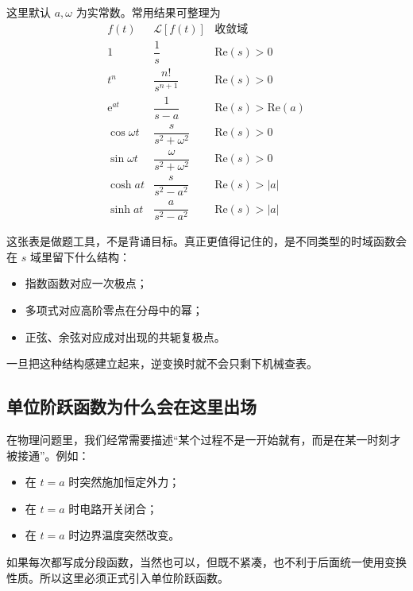 \begin{zhongyao}[常用拉普拉斯变换表]
这里默认 $a,\omega$ 为实常数。常用结果可整理为
\begingroup
\renewcommand{\arraystretch}{1.35}
\[
\begin{array}{c|c|c}
    f(t) & \mathcal{L}[f(t)] & \text{收敛域} \\
    \hline
    1 & \dfrac{1}{s} & \mathrm{Re}(s)>0 \\
    t^n & \dfrac{n!}{s^{n+1}} & \mathrm{Re}(s)>0 \\
    \mathrm{e}^{at} & \dfrac{1}{s-a} & \mathrm{Re}(s)>\mathrm{Re}(a) \\
    \cos\omega t & \dfrac{s}{s^2+\omega^2} & \mathrm{Re}(s)>0 \\
    \sin\omega t & \dfrac{\omega}{s^2+\omega^2} & \mathrm{Re}(s)>0 \\
    \cosh at & \dfrac{s}{s^2-a^2} & \mathrm{Re}(s)>|a| \\
    \sinh at & \dfrac{a}{s^2-a^2} & \mathrm{Re}(s)>|a|
\end{array}
\]
\endgroup
\end{zhongyao}

\begin{tishi}[变换表应该怎样使用]
这张表是做题工具，不是背诵目标。真正更值得记住的，是不同类型的时域函数会在 $s$ 域里留下什么结构：
\begin{itemize}
    \item 指数函数对应一次极点；
    \item 多项式对应高阶零点在分母中的幂；
    \item 正弦、余弦对应成对出现的共轭复极点。
\end{itemize}
一旦把这种结构感建立起来，逆变换时就不会只剩下机械查表。
\end{tishi}

\subsection{单位阶跃函数为什么会在这里出场}

在物理问题里，我们经常需要描述``某个过程不是一开始就有，而是在某一时刻才被接通''。例如：
\begin{itemize}
    \item 在 $t=a$ 时突然施加恒定外力；
    \item 在 $t=a$ 时电路开关闭合；
    \item 在 $t=a$ 时边界温度突然改变。
\end{itemize}

如果每次都写成分段函数，当然也可以，但既不紧凑，也不利于后面统一使用变换性质。所以这里必须正式引入单位阶跃函数。

